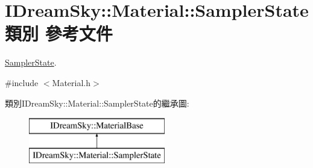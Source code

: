 \hypertarget{class_i_dream_sky_1_1_material_1_1_sampler_state}{}\section{I\+Dream\+Sky\+:\+:Material\+:\+:Sampler\+State 類別 參考文件}
\label{class_i_dream_sky_1_1_material_1_1_sampler_state}


\hyperlink{class_i_dream_sky_1_1_material_1_1_sampler_state}{Sampler\+State}.  




{\ttfamily \#include $<$Material.\+h$>$}

類別\+I\+Dream\+Sky\+:\+:Material\+:\+:Sampler\+State的繼承圖\+:\begin{figure}[H]
\begin{center}
\leavevmode
\includegraphics[height=2.000000cm]{class_i_dream_sky_1_1_material_1_1_sampler_state}
\end{center}
\end{figure}
